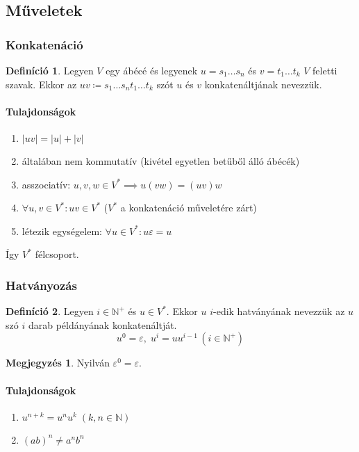 \documentclass[a4paper,12pt]{article}
\theoremstyle{definition}
\newtheorem*{definition*}{Definíció}
\newtheorem*{remark}{Megjegyzés}
\begin{document}
	\subsection{Műveletek}
	\subsubsection{Konkatenáció}
	\begin{definition*}
		Legyen $V$ egy ábécé és legyenek $ u = s_1 \dots s_n $ és $ v = t_1 \dots t_k $ $V$ feletti szavak. Ekkor az $uv \coloneq s_1 \dots s_n t_1 \dots t_k $ szót $u$ és $v$ konkatenáltjának nevezzük.
	\end{definition*}
	\paragraph{Tulajdonságok}
	\begin{enumerate}
		\item{$ \left| uv \right| = \left| u \right| + \left| v \right| $}
		\item általában nem kommutatív (kivétel egyetlen betűből álló ábécék)
		\item asszociatív: $ u,v,w \in V^* \implies u(vw) = (uv)w $
		\item $ \forall u,v \in V^*: uv \in V^* $ ($ V^* $ a konkatenáció műveletére zárt)
		\item létezik egységelem: $ \forall u \in V^*: u\varepsilon = u $
	\end{enumerate}
	Így $V^*$ félcsoport.
	
	\newpage
	\subsubsection{Hatványozás}
	\begin{definition*}
		Legyen $ i \in \mathbb{N}^+ $ és $ u \in V^* $. Ekkor $u$ $i$-edik hatványának nevezzük az $u$ szó $i$ darab példányának konkatenáltját.
		\[
		u^0 = \varepsilon, \; u^i = uu^{i-1} \, (i \in \mathbb{N}^+)
		\]
	\end{definition*}

	\begin{remark}
		Nyilván $\varepsilon^0 = \varepsilon$.
	\end{remark}
	\paragraph{Tulajdonságok}
	\begin{enumerate}
		\item{$u^{n+k} = u^n u^k \; \left( k,n \in \mathbb{N} \right)  $}
		\item{$ (ab)^n \ne a^nb^n $}
	\end{enumerate}
	
\end{document}
